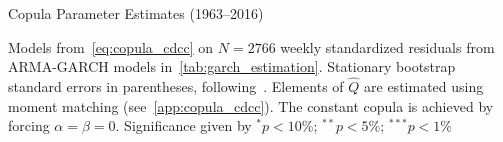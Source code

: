 
\begin{table}
  \centering
  \footnotesize
  \renewcommand{\arraystretch}{1.2}

  \caption{Copula Parameter Estimates (1963--2016)}

  \begin{longcaption}
    Models from~\autoref{eq:copula_cdcc} on $N = 2766$ weekly standardized residuals from ARMA-GARCH models in~\autoref{tab:garch_estimation}. Stationary bootstrap standard errors in parentheses, following~\autocite{PolitisRomano1994}. Elements of $\hat{Q}$ are estimated using moment matching (see~\autoref{app:copula_cdcc}). The constant copula is achieved by forcing $\alpha = \beta = 0$. Significance given by $^{*}p<10\%$; $^{**}p<5\%$; $^{***}p<1\%$
  \end{longcaption}


\end{table}
